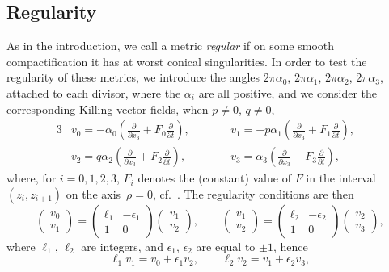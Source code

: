 \documentclass[pdftex]{sigma}
\numberwithin{equation}{section}
\begin{document}
\subsection{Regularity} As in the introduction, we call a metric \emph{regular} if on some smooth compactification it has at worst conical singularities. In order to test the regularity of these metrics, we introduce the angles $2 \pi \alpha _0$, $2 \pi \alpha _1$, $2 \pi \alpha _2$, $2 \pi \alpha _3$, attached to each divisor, where the $\alpha _i$ are all positive, and we consider the corresponding Killing vector fields, when $p \neq 0$, $q \neq 0$,
\begin{alignat}{3}
 & v _0 = - \alpha _0 \left(\frac{\partial}{\partial x _3} + F _0 \frac{\partial}{\partial t}\right), \qquad && v _1 = - p \alpha _1 \left(\frac{\partial}{\partial x _3} + F _1 \frac{\partial}{\partial t}\right),& \nonumber \\
& v _2 = q \alpha _2 \left(\frac{\partial}{\partial x _3} + F _2 \frac{\partial}{\partial t}\right), \qquad && v _3 = \alpha _3 \left(\frac{\partial}{\partial x _3} + F _3 \frac{\partial}{\partial t}\right),& \label{v-i}
 \end{alignat}
where, for $i = 0, 1, 2, 3$, $F _i$ denotes the (constant) value of $F$ in the interval $(z_i, z _{i + 1})$ on the axis~$\rho = 0$, cf.\ \cite[Lemma 7.1]{BG}. The regularity conditions are then
\[ \begin{pmatrix} v_0 \\ v_1 \end{pmatrix} = \begin{pmatrix} \ell _1 & - \epsilon _1 \\ 1 & 0 \end{pmatrix} \begin{pmatrix} v_1 \\ v_2 \end{pmatrix}, \qquad \begin{pmatrix} v_1 \\ v_2 \end{pmatrix} = \begin{pmatrix} \ell _2 & - \epsilon _2 \\ 1 & 0 \end{pmatrix} \begin{pmatrix} v_2 \\ v_3 \end{pmatrix},
\]
where $\ell _1$, $\ell _2$ are integers, and $\epsilon _1$, $\epsilon _2$ are equal to $\pm 1$, hence
\[ \ell _1 v_1 = v_0 + \epsilon _1 v_2, \qquad \ell _2 v_2 = v_1 + \epsilon _2 v_3, \]
\end{document}
